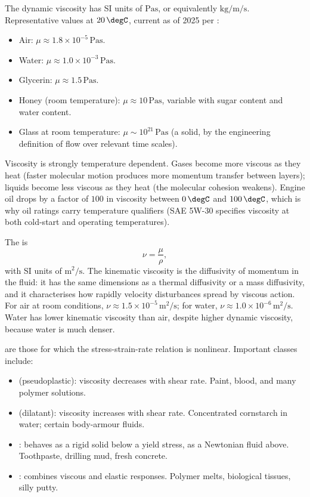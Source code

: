The dynamic viscosity has SI units of $\si{\pascal\second}$, or
equivalently $\si{\kilogram\per\meter\per\second}$. Representative
values at $20\,\degC$, current as of 2025 per
\textcite{text:white-fluid-mechanics}:

\begin{itemize}[leftmargin=*]
  \item Air: $\mu \approx 1.8\times 10^{-5}\,\si{\pascal\second}$.
  \item Water: $\mu \approx 1.0\times 10^{-3}\,\si{\pascal\second}$.
  \item Glycerin: $\mu \approx 1.5\,\si{\pascal\second}$.
  \item Honey (room temperature): $\mu \approx 10\,\si{\pascal\second}$,
    variable with sugar content and water content.
  \item Glass at room temperature: $\mu \sim 10^{21}\,\si{\pascal
    \second}$ (a solid, by the engineering definition of flow over
    relevant time scales).
\end{itemize}

Viscosity is strongly temperature dependent. Gases become more
viscous as they heat (faster molecular motion produces more
momentum transfer between layers); liquids become less viscous as
they heat (the molecular cohesion weakens). Engine oil drops by a
factor of $100$ in viscosity between $0\,\degC$ and $100\,\degC$,
which is why oil ratings carry temperature qualifiers (SAE 5W-30
specifies viscosity at both cold-start and operating temperatures).

The  is
\[
\nu = \frac{\mu}{\rho},
\]
with SI units of $\si{\meter}^2/\si{\second}$. The kinematic
viscosity is the diffusivity of momentum in the fluid: it has the
same dimensions as a thermal diffusivity or a mass diffusivity, and
it characterises how rapidly velocity disturbances spread by
viscous action. For air at room conditions, $\nu \approx 1.5\times
10^{-5}\,\si{\meter}^2/\si{\second}$; for water, $\nu \approx
1.0\times 10^{-6}\,\si{\meter}^2/\si{\second}$. Water has lower
kinematic viscosity than air, despite higher dynamic viscosity,
because water is much denser.

 are those for which the
stress-strain-rate relation is nonlinear. Important classes
include:

\begin{itemize}[leftmargin=*]
  \item {} (pseudoplastic): viscosity decreases
    with shear rate. Paint, blood, and many polymer solutions.
  \item {} (dilatant): viscosity increases
    with shear rate. Concentrated cornstarch in water; certain
    body-armour fluids.
  \item {}: behaves as a rigid solid below a
    yield stress, as a Newtonian fluid above. Toothpaste, drilling
    mud, fresh concrete.
  \item {}: combines viscous and elastic
    responses. Polymer melts, biological tissues, silly putty.
\end{itemize}

